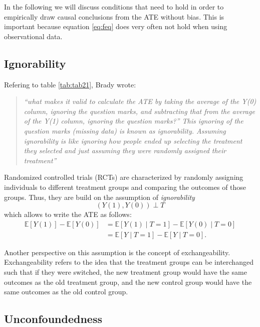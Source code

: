 \documentclass[
  12pt,
  oneside]{book}
\theoremstyle{definition}
\theoremstyle{definition}
\theoremstyle{definition}
\theoremstyle{definition}
\theoremstyle{remark}
\begin{document}
In the following we will discuss conditions that need to hold in order to empirically draw causal conclusions from the ATE without bias. This is important because equation \eqref{eq:feq} does very often not hold when using observational data.

\hypertarget{ignorability}{%
\subsection{Ignorability}\label{ignorability}}

Refering to table \ref{tab:tab21}, Brady \citet{Neal2020Introduction} wrote:

\begin{quote}
\emph{``what makes it valid to calculate the ATE by taking the average of the Y(0) column, ignoring the question marks, and subtracting that from the average of the Y(1) column, ignoring the question marks?'' This ignoring of the question marks (missing data) is known as ignorability. Assuming ignorability is like ignoring how people ended up selecting the treatment they selected and just assuming they were randomly assigned their treatment''} \citep[p.~9]{Neal2020Introduction}
\end{quote}

Randomized controlled trials (RCTs) are characterized by randomly assigning individuals to different treatment groups and comparing the outcomes of those groups. Thus, they are build on the assumption of \emph{ignorability}
\[
(Y(1), Y(0)) \perp T
\]
which allows to write the ATE as follows:
\begin{align}
\mathbb{E}[Y(1)]-\mathbb{E}[Y(0)] & =\mathbb{E}[Y(1) \mid T=1]-\mathbb{E}[Y(0) \mid T=0] \\
& =\mathbb{E}[Y \mid T=1]-\mathbb{E}[Y \mid T=0].\label{eq:feq2}
\end{align}

Another perspective on this assumption is the concept of exchangeability. Exchangeability refers to the idea that the treatment groups can be interchanged such that if they were switched, the new treatment group would have the same outcomes as the old treatment group, and the new control group would have the same outcomes as the old control group.

\hypertarget{unconfoundedness}{%
\subsection{Unconfoundedness}\label{unconfoundedness}}
\end{document}
